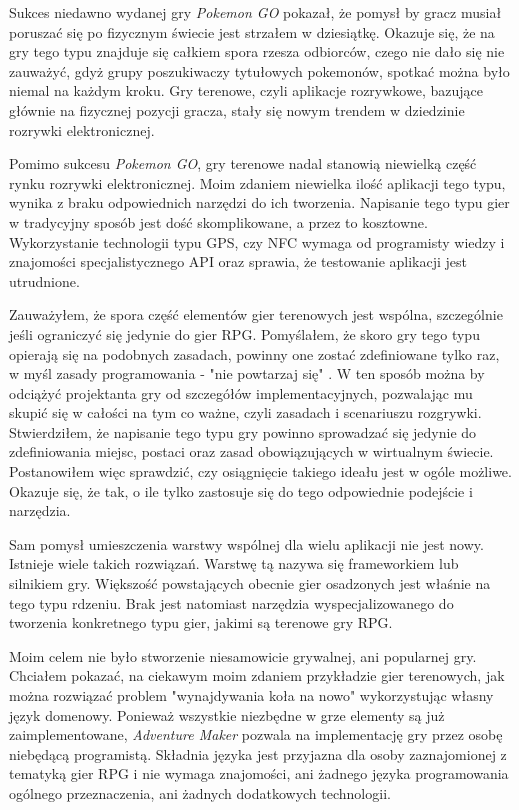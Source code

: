 \documentclass[openright]{xmgr}
\begin{document}
Sukces niedawno wydanej gry \textit{Pokemon GO} pokazał, że pomysł by gracz musiał poruszać się po fizycznym świecie jest strzałem w dziesiątkę. Okazuje się, że na gry tego typu znajduje się całkiem spora rzesza odbiorców, czego nie dało się nie zauważyć, gdyż grupy poszukiwaczy tytułowych pokemonów, spotkać można było niemal na każdym kroku. Gry terenowe, czyli aplikacje rozrywkowe, bazujące głównie na fizycznej pozycji gracza, stały się nowym trendem w dziedzinie rozrywki elektronicznej.

Pomimo sukcesu \textit{Pokemon GO}, gry terenowe nadal stanowią niewielką część rynku rozrywki elektronicznej. Moim zdaniem niewielka ilość aplikacji tego typu, wynika z braku odpowiednich narzędzi do ich tworzenia. Napisanie tego typu gier w tradycyjny sposób jest dość skomplikowane, a przez to kosztowne. Wykorzystanie technologii typu GPS, czy NFC wymaga od programisty wiedzy i znajomości specjalistycznego API oraz sprawia, że testowanie aplikacji jest utrudnione.

Zauważyłem, że spora część elementów gier terenowych jest wspólna, szczególnie jeśli ograniczyć się jedynie do gier RPG. Pomyślałem, że skoro gry tego typu opierają się na podobnych zasadach, powinny one zostać zdefiniowane tylko raz, w myśl zasady programowania - "nie powtarzaj się" \cite{CleanCode:2005}. W ten sposób można by odciążyć projektanta gry od szczegółów implementacyjnych, pozwalając mu skupić się w całości na tym co ważne, czyli zasadach i scenariuszu rozgrywki. Stwierdziłem, że napisanie tego typu gry powinno sprowadzać się jedynie do zdefiniowania miejsc, postaci oraz zasad obowiązujących w wirtualnym świecie. Postanowiłem więc sprawdzić, czy osiągnięcie takiego ideału jest w ogóle możliwe. Okazuje się, że tak, o ile tylko zastosuje się do tego odpowiednie podejście i narzędzia.

Sam pomysł umieszczenia warstwy wspólnej dla wielu aplikacji nie jest nowy. Istnieje wiele takich rozwiązań. Warstwę tą nazywa się frameworkiem lub silnikiem gry. Większość powstających obecnie gier osadzonych jest właśnie na tego typu rdzeniu. Brak jest natomiast narzędzia wyspecjalizowanego do tworzenia konkretnego typu gier, jakimi są terenowe gry RPG.

Moim celem nie było stworzenie niesamowicie grywalnej, ani popularnej gry. Chciałem pokazać, na ciekawym moim zdaniem przykładzie gier terenowych, jak można rozwiązać problem "wynajdywania koła na nowo" wykorzystując własny język domenowy. Ponieważ wszystkie niezbędne w grze elementy są już zaimplementowane, \textit{Adventure Maker} pozwala na implementację gry przez osobę niebędącą programistą. Składnia języka jest przyjazna dla osoby zaznajomionej z tematyką gier RPG i nie wymaga znajomości, ani żadnego języka programowania ogólnego przeznaczenia, ani żadnych dodatkowych technologii.
\end{document}
